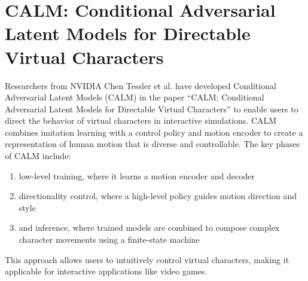 \section{CALM: Conditional Adversarial Latent Models for Directable Virtual Characters}

Researchers from NVIDIA  Chen Tessler et al. have developed Conditional Adversarial Latent Models (CALM)  in the paper ``CALM: Conditional Adversarial Latent Models for Directable Virtual Characters''\cite{CALM} to enable users to direct the behavior of virtual characters in interactive simulations. CALM combines imitation learning with a control policy and motion encoder to create a representation of human motion that is diverse and controllable. The key phases of CALM include:
\begin{enumerate}
    \item low-level training, where it learns a motion encoder and decoder
    \item directionality control, where a high-level policy guides motion direction and style
    \item and inference, where trained models are combined to compose complex character movements using a finite-state machine
\end{enumerate}
This approach allows users to intuitively control virtual characters, making it applicable for interactive applications like video games.